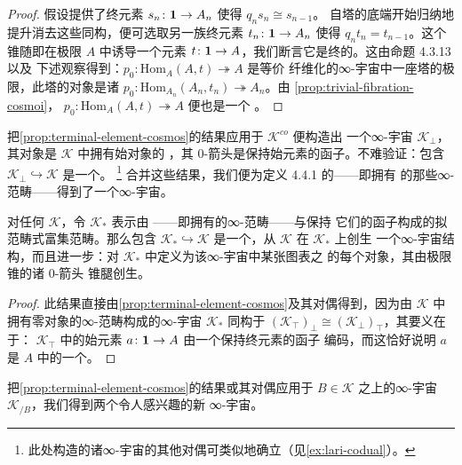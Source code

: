 \begin{proof}
假设提供了终元素 $s_{n}\colon\mathbf{1}\to A_{n}$ 使得 $q_{n}s_{n}\cong s_{n-1}$。
自塔的底端开始归纳地提升消去这些同构，便可选取另一族终元素
$t_{n}\colon\mathbf{1}\to A_{n}$ 使得 $q_{n}t_{n}=t_{n-1}$。这个锥随即在极限 $A$
中诱导一个元素 $t\colon\mathbf{1}\to A$，我们断言它是终的。这由命题 4.3.13 以及
下述观察得到：$p_{0}\colon\mathrm{Hom}_{A}(A,t)\twoheadrightarrow A$ 是等价
纤维化的∞-宇宙中一座塔的极限，此塔的对象是诸\trTrivialFibration{}
$p_{0}\colon\mathrm{Hom}_{A_{n}}(A_{n},t_{n})\twoheadrightarrow A_{n}$。由
\cref{prop:trivial-fibration-cosmoi}，
$p_{0}\colon\mathrm{Hom}_{A}(A,t)\twoheadrightarrow A$ 便也是一个%
\trTrivialFibration{}。
\end{proof}

把\cref{prop:terminal-element-cosmos}的结果应用于 $\mathcal{K}^{co}$ 便构造出
一个∞-宇宙 $\mathcal{K}_{\perp}$，其对象是 $\mathcal{K}$ 中拥有始对象的%
\trInfinityCategory{}，其 0-箭头是保持始元素的函子。不难验证：包含
$\mathcal{K}_{\perp}\hookrightarrow\mathcal{K}$ 是一个\trCosmologicalEmbedding{}。
\footnote{此处构造的诸∞-宇宙的其他对偶可类似地确立（见\cref{ex:lari-codual}）。}
合并这些结果，我们便为定义 4.4.1 的\trPointed{}\trInfinityCategory——即拥有%
\trZeroElement{}的那些∞-范畴——得到了一个∞-宇宙。

\begin{proposition}\label{prop:pointed-cosmos}
对任何\trInfinityCosmos{} $\mathcal{K}$，令 $\mathcal{K}_{*}$ 表示由%
\trPointed{}\trInfinityCategory——即拥有\trZeroElement{}的∞-范畴——与保持
它们的函子构成的拟范畴式富集范畴。那么包含 $\mathcal{K}_{*}\hookrightarrow\mathcal{K}$
是一个\trCosmologicalEmbedding{}，从 $\mathcal{K}$ 在 $\mathcal{K}_{*}$ 上创生
一个∞-宇宙结构，而且进一步：对 $\mathcal{K}_{*}$ 中定义为该∞-宇宙中某张图表之%
\trFlexibleWeightedLimit{}的每个对象，其\trZeroElement{}由极限锥的诸 0-箭头
锥腿创生。
\end{proposition}

\begin{proof}
此结果直接由\cref{prop:terminal-element-cosmos}及其对偶得到，因为由 $\mathcal{K}$
中拥有零对象的∞-范畴构成的∞-宇宙 $\mathcal{K}_{*}$ 同构于
$(\mathcal{K}_{\top})_{\perp}\cong(\mathcal{K}_{\perp})_{\top}$，其要义在于：
$\mathcal{K}_{\top}$ 中的始元素 $a\colon\mathbf{1}\to A$ 由一个保持终元素的函子
编码，而这恰好说明 $a$ 是 $A$ 中的一个\trZeroElement{}。
\end{proof}

把\cref{prop:terminal-element-cosmos}的结果或其对偶应用于 $B\in\mathcal{K}$
之上\trIsofibration{}的∞-宇宙 $\mathcal{K}_{/B}$，我们得到两个令人感兴趣的新
∞-宇宙。

